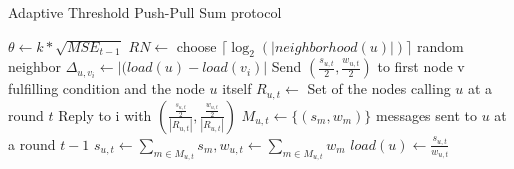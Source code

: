 \begin{algorithm}
    \caption{Adaptive Threshold Push-Pull Sum protocol}\label{alg:PPS}
    \begin{algorithmic}[1]
    \State $\theta \leftarrow k * \sqrt{MSE_{t-1}}$ 
    \EndProcedure
    \State $RN \leftarrow$ choose $\lceil \log_{2}{(|neighborhood(u)|)} \rceil$ random neighbor
    \State $\Delta_{u, v_{i}} \leftarrow |(load(u) - load(v_{i})|$
    \State Send $(\frac{s_{u,t}}{2}, \frac{w_{u,t}}{2})$ to first node v fulfilling condition and the node $u$ itself
    \EndIf
    \EndFor
    \EndProcedure
    \State $R_{u,t} \leftarrow$ Set of the nodes calling $u$ at a round $t$
    \State Reply to i with $\left( \frac{\frac{s_{u,t}}{2}}{|R_{u,t}|}, \frac{\frac{w_{u,t}}{2}}{|R_{u,t}|} \right)$
    \EndFor
    \EndProcedure
    \State $M_{u,t} \leftarrow \{(s_{m}, w_{m})\}$ messages sent to $u$ at a round $t-1$
    \State $s_{u,t} \leftarrow \sum_{m \in M_{u,t}}^{}s_{m}, w_{u,t} \leftarrow\sum_{m \in M_{u,t}}^{}w_{m}$
    \State $load(u) \leftarrow \frac{s_{u,t}}{w_{u,t}}$
    \EndProcedure
    \end{algorithmic}
    \end{algorithm}